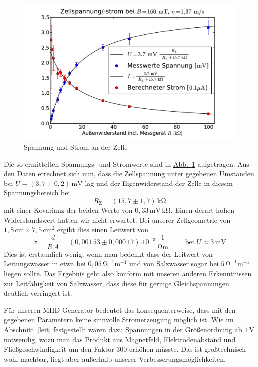 \documentclass[11pt]{scrartcl}
\newcommand{\unit}[1]{\ensuremath{\,\mathrm{#1}}} %
\newcommand{\ee}[1]{\ensuremath{\cdot\! 10^{#1}}}
\newcommand{\abb}[1]{\hyperref[#1]{Abb.~\ref{#1}}}
\begin{document}
\begin{figure}[ht]
\begin{center}
\includegraphics[width=1.0\textwidth]{images/strom.pdf}
\end{center}
\vspace{-1.5\baselineskip}
\caption{Spannung und Strom an der Zelle}
\label{fig:strom}
\end{figure}

Die so ermittelten Spannungs- und Stromwerte sind in \abb{fig:strom} aufgetragen.
Aus den Daten errechnet sich nun, dass die Zellspannung unter gegebenen Umständen bei $U = (3,7 \pm 0,2)\unit{mV}$ lag und der Eigenwiderstand der Zelle in diesem Spannungsbereich bei
\begin{equation}
R_{\text{Z}} = (15,7 \pm 1,7)\unit{k\Omega}
\end{equation}
mit einer Kovarianz der beiden Werte von $0,33\unit{mV}\unit{k\Omega}$.
Einen derart hohen Widerstandswert hatten wir nicht erwartet.
Bei unserer Zellgeometrie von $1,8\unit{cm}\times 7,5\unit{cm^2}$ ergibt dies einen Leitwert von
\begin{equation}
\sigma
= \frac{d}{R\,A}
= (0,001\,53 \pm 0,000\,17)\ee{-3}\unit{\frac{1}{\Omega m}}
\qquad
\text{ bei } U\approx 3\unit{mV}
\label{eqn:sigma}
\end{equation}
Dies ist erstaunlich wenig, wenn man bedenkt dass der Leitwert von Leitungswasser in etwa bei $0,05\unit{\Omega^{-1}m^{-1}}$ und von Salzwasser sogar bei $5\unit{\Omega^{-1}m^{-1}}$ liegen sollte.
Das Ergebnis geht also konform mit unseren anderen Erkenntnissen zur Leitfähigkeit von Salzwasser, dass diese für geringe Gleichspannungen deutlich verringert ist.

Für unseren MHD-Generator bedeutet das konsequenterweise, dass mit den gegebenen Parametern keine sinnvolle Stromerzeugung möglich ist. Wie im \hyperref[leit]{Abschnitt~\ref{leit}} festgestellt wären dazu Spannungen in der Größenordnung ab $1\unit{V}$ notwendig, wozu man das Produkt aus Magnetfeld, Elektrodenabstand und Fließgeschwindigkeit um den Faktor 300 erhöhen müsste. Das ist großtechnisch wohl machbar, liegt aber außerhalb unserer Verbesserungsmöglichkeiten.
\end{document}
